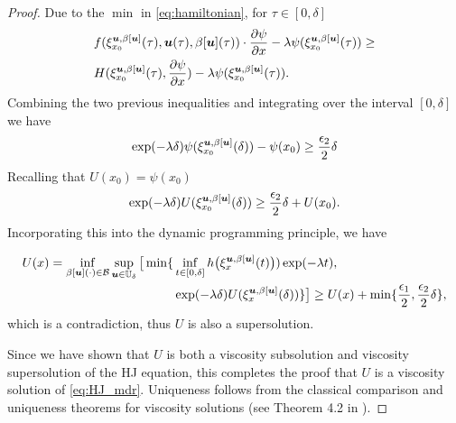 \begin{for_journal}
\begin{proof}
Due to the $\min{}$ in \eqref{eq:hamiltonian}, for $\tau \in [0,\delta]$
%
\begin{equation}
\begin{split}
&f(\xi_{x_0}^{\bm{u},\beta[\bm{u}]}(\tau),\bm{u}(\tau), \beta[\bm{u}](\tau)) \cdot \frac{\partial \psi}{\partial x} - \lambda \psi(\xi_{x_0}^{\bm{u},\beta[\bm{u}]}(\tau)) \geq \\ &H(\xi_{x_0}^{\bm{u},\beta[\bm{u}]}(\tau), \frac{\partial \psi}{\partial x}) - \lambda \psi(\xi_{x_0}^{\bm{u},\beta[\bm{u}]}(\tau)).
\end{split}
\end{equation}
%
Combining the two previous inequalities and integrating over the interval $[0,\delta]$ we have
%
\begin{equation}
\exp(-\lambda \delta)\psi(\xi_{x_0}^{\bm{u},\beta[\bm{u}]}(\delta))-\psi(x_0) \geq \frac{\epsilon_2}{2} \delta
\end{equation}
%
Recalling that $U(x_0)=\psi(x_0)$
%
\begin{equation}
\exp(-\lambda \delta)U(\xi_{x_0}^{\bm{u},\beta[\bm{u}]}(\delta)) \geq \frac{\epsilon_2}{2} \delta + U(x_0).
\end{equation}
%
Incorporating this into the dynamic programming principle, we have
%

\begin{equation} 
\begin{split}
U(x) = 
\inf_{\beta[\bm{u}](\cdot) \in \mathcal{B}} \sup_{\bm{u} \in \mathbb{U}_\delta} 
\big [\min\{ &\inf_{t \in [0, \delta]} h\big(\xi_{x}^{\bm{u},\beta[\bm{u}]}(t)\big))\exp(-\lambda  t), \\&\exp(-\lambda \delta)U(\xi_{x}^{\bm{u},\beta[\bm{u}]}(\delta))\}
\big ]\geq
U(x) + \min\{\frac{\epsilon_1}{2}, \frac{\epsilon_2}{2} \delta \},
\end{split}
\end{equation}
%
which is a contradiction, thus $U$ is also a supersolution.

Since we have shown that $U$ is both a viscosity subsolution and viscosity supersolution of the HJ equation, this completes the proof that $U$ is a viscosity solution of \eqref{eq:HJ_mdr}. Uniqueness follows from the classical comparison and uniqueness theorems for viscosity solutions (see Theorem 4.2 in \cite{Barron1989}).
\end{proof}
\end{for_journal}